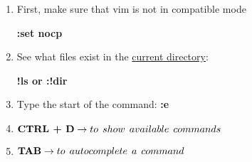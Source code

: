 \documentclass[12pt, letterpaper]{article}
\begin{document}
\begin{flushleft}
\begin{enumerate}
    \item First, make sure that vim is not in compatible mode \par \textbf{:set nocp} \\ \par
    \item See what files exist in the \underline{current directory}: \par \textbf{!ls or :!dir} \\ \par
    \item Type the start of the command: \textbf{:e} 
    \item $\textbf{CTRL + D} \rightarrow to \hspace{1ex} show \hspace{1ex}  available \hspace{1ex}  commands $
    \item $\textbf{TAB} \rightarrow to \hspace{1ex}  autocomplete \hspace{1ex}  a \hspace{1ex}  command $ \\ \par
  
    
\end{enumerate}

\end{flushleft}
\end{document}
